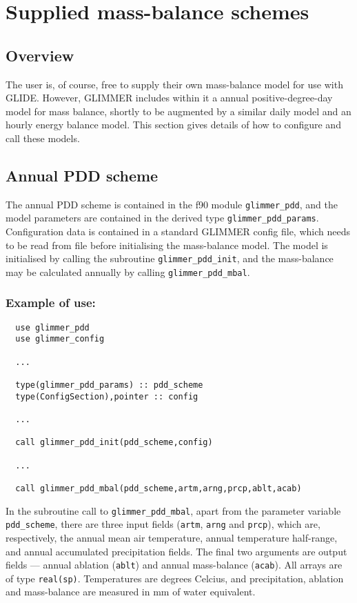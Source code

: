 \section{Supplied mass-balance schemes}
\subsection{Overview}
The user is, of course, free to supply their own mass-balance model for use
with GLIDE. However, GLIMMER includes within it a annual positive-degree-day model
for mass balance, shortly to be augmented by a similar daily model and an
hourly energy balance model. This section gives details of how to configure
and call these models.
\subsection{Annual PDD scheme}
\label{ug.mbal.pdd_scheme}
The annual PDD scheme is contained in the f90 module \texttt{glimmer\_pdd},
and the model parameters are contained in the derived type
\texttt{glimmer\_pdd\_params}. Configuration data is contained in a standard
GLIMMER config file, which needs to be read from file before initialising the
mass-balance model. The model is initialised by calling the subroutine
\texttt{glimmer\_pdd\_init}, and the mass-balance may be calculated annually
by calling \texttt{glimmer\_pdd\_mbal}. 

\subsubsection{Example of use:}
\begin{verbatim}
  use glimmer_pdd
  use glimmer_config

  ...

  type(glimmer_pdd_params) :: pdd_scheme
  type(ConfigSection),pointer :: config

  ...

  call glimmer_pdd_init(pdd_scheme,config)

  ...

  call glimmer_pdd_mbal(pdd_scheme,artm,arng,prcp,ablt,acab)
\end{verbatim}
In the subroutine call to \texttt{glimmer\_pdd\_mbal}, apart from the
parameter variable \texttt{pdd\_scheme}, there are three input fields
(\texttt{artm}, \texttt{arng} and \texttt{prcp}), which are, respectively, the
annual mean air temperature, annual temperature half-range, and annual
accumulated precipitation fields. The final two arguments are output fields
--- annual ablation (\texttt{ablt}) and annual mass-balance
(\texttt{acab}). All arrays are of type \texttt{real(sp)}. Temperatures are
degrees Celcius, and precipitation, ablation and mass-balance are measured in
mm of water equivalent.
%
%
%
